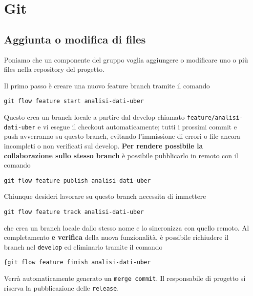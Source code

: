 

\chapter{Git}

\section{Aggiunta o modifica di files}
Poniamo che un componente del gruppo voglia aggiungere o modificare uno o pi\`{u} files nella repository del progetto.

Il primo passo \`{e} creare una nuovo feature branch tramite il comando
\begin{lstlisting}
git flow feature start analisi-dati-uber
\end{lstlisting}
Questo crea un branch locale a partire dal develop chiamato \texttt{feature/analisi-dati-uber} e vi esegue il checkout automaticamente; tutti i prossimi commit e push avverranno su questo branch, evitando l'immissione di errori o file ancora incompleti o non verificati sul develop.
\textbf{Per rendere possibile la collaborazione sullo stesso branch} \`{e} possibile pubblicarlo in remoto con il comando
\begin{lstlisting}
git flow feature publish analisi-dati-uber
\end{lstlisting}
Chiunque desideri lavorare su questo branch necessita di immettere
\begin{lstlisting}
git flow feature track analisi-dati-uber
\end{lstlisting}
che crea un branch locale dallo stesso nome e lo sincronizza con quello remoto.
Al completamento \textbf{e verifica} della nuova funzionalit\`{a}, \`{e} possibile richiudere il branch nel \texttt{develop} ed eliminarlo tramite il comando
\begin{lstlisting}
{git flow feature finish analisi-dati-uber
\end{lstlisting}
Verr\`{a} automaticamente generato un \texttt{merge commit}.
Il responsabile di progetto si riserva la pubblicazione delle \texttt{release}.

